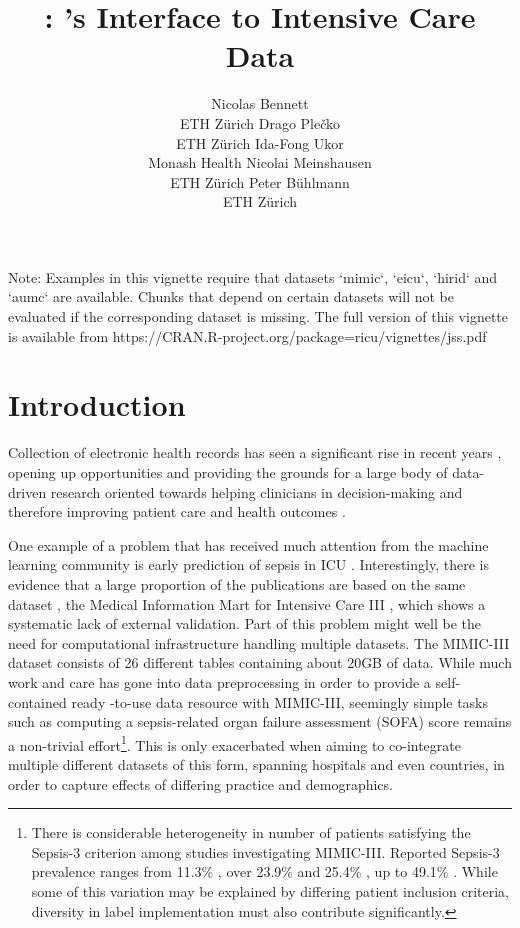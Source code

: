 \documentclass[
  notitle]{jss}
\author{
Nicolas Bennett\footnotemark[1]\\ETH Zürich \And Drago
Plečko\footnotemark[1]\footnotetext[1]{These authors contributed equally.}\\ETH Zürich \And Ida-Fong Ukor\\Monash Health \AND Nicolai Meinshausen\\ETH Zürich \And Peter Bühlmann\\ETH Zürich
}
\title{\pkg{ricu}: \proglang{R}'s Interface to Intensive Care Data}
\begin{document}
\maketitle

\renewcommand*{\thefootnote}{\fnsymbol{footnote}}
\renewcommand*{\thefootnote}{\arabic{footnote}}

\begin{CodeChunk}
\begin{CodeOutput}
Note: Examples in this vignette require that datasets `mimic`, `eicu`,
`hirid` and `aumc` are available. Chunks that depend on certain
datasets will not be evaluated if the corresponding dataset is missing.
The full version of this vignette is available from
https://CRAN.R-project.org/package=ricu/vignettes/jss.pdf
\end{CodeOutput}
\end{CodeChunk}

\hypertarget{introduction}{%
\section{Introduction}\label{introduction}}

Collection of electronic health records has seen a significant rise in
recent years \citep{evans2016}, opening up opportunities and providing
the grounds for a large body of data-driven research oriented towards
helping clinicians in decision-making and therefore improving patient
care and health outcomes \citep{jiang2017}.

One example of a problem that has received much attention from the
machine learning community is early prediction of sepsis in ICU
\citep{desautels2016, nemati2018, futoma2017, kam2017}. Interestingly,
there is evidence that a large proportion of the publications are based
on the same dataset \citep{fleuren2019}, the Medical Information Mart
for Intensive Care III \citep[MIMIC-III;][]{johnson2016}, which shows a
systematic lack of external validation. Part of this problem might well
be the need for computational infrastructure handling multiple datasets.
The MIMIC-III dataset consists of 26 different tables containing about
20GB of data. While much work and care has gone into data preprocessing
in order to provide a self-contained ready -to-use data resource with
MIMIC-III, seemingly simple tasks such as computing a sepsis-related
organ failure assessment (SOFA) score \citep{vincent1996} remains a
non-trivial effort\footnote{There is considerable heterogeneity in
  number of patients satisfying the Sepsis-3 criterion
  \citep[of which SOFA provides a major component;][]{singer2016} among
  studies investigating MIMIC-III. Reported Sepsis-3 prevalence ranges
  from 11.3\% \citep{desautels2016}, over 23.9\% \citep{nemati2018} and
  25.4\% \citep{wang2018}, up to 49.1\% \citep{johnson2018}. While some
  of this variation may be explained by differing patient inclusion
  criteria, diversity in label implementation must also contribute
  significantly.}. This is only exacerbated when aiming to co-integrate
multiple different datasets of this form, spanning hospitals and even
countries, in order to capture effects of differing practice and
demographics.
\end{document}
